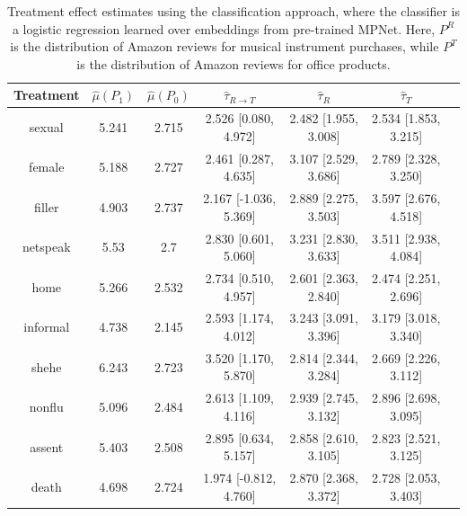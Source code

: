 \documentclass{article}
\begin{document}
\begin{table}[!ht]
    \centering
    \begin{tabular}{c|cccccc}
\toprule
      Treatment &   $\hat{\mu}(P_1)$ &   $\hat{\mu}(P_0)$ & $\hat{\tau}_{R \rightarrow T}$   & $\hat{\tau}_R$       & $\hat{\tau}_T$       \\
\midrule
    sexual   &              5.241 &              2.715 & 2.526 [0.080, 4.972]             & 2.482 [1.955, 3.008] & 2.534 [1.853, 3.215] \\
    female   &              5.188 &              2.727 & 2.461 [0.287, 4.635]             & 3.107 [2.529, 3.686] & 2.789 [2.328, 3.250] \\
    filler   &              4.903 &              2.737 & 2.167 [-1.036, 5.369]            & 2.889 [2.275, 3.503] & 3.597 [2.676, 4.518] \\
    netspeak &              5.53  &              2.7   & 2.830 [0.601, 5.060]             & 3.231 [2.830, 3.633] & 3.511 [2.938, 4.084] \\
    home     &              5.266 &              2.532 & 2.734 [0.510, 4.957]             & 2.601 [2.363, 2.840] & 2.474 [2.251, 2.696] \\
    informal &              4.738 &              2.145 & 2.593 [1.174, 4.012]             & 3.243 [3.091, 3.396] & 3.179 [3.018, 3.340] \\
    shehe    &              6.243 &              2.723 & 3.520 [1.170, 5.870]             & 2.814 [2.344, 3.284] & 2.669 [2.226, 3.112] \\
    nonflu   &              5.096 &              2.484 & 2.613 [1.109, 4.116]             & 2.939 [2.745, 3.132] & 2.896 [2.698, 3.095] \\
    assent   &              5.403 &              2.508 & 2.895 [0.634, 5.157]             & 2.858 [2.610, 3.105] & 2.823 [2.521, 3.125] \\
    death    &              4.698 &              2.724 & 1.974 [-0.812, 4.760]            & 2.870 [2.368, 3.372] & 2.728 [2.053, 3.403] \\
 \bottomrule
    \end{tabular}
    \caption{Treatment effect estimates using the classification approach, where the classifier is a logistic regression learned over embeddings from pre-trained MPNet. Here, $P^R$ is the distribution of Amazon reviews for musical instrument purchases, while $P^T$ is the distribution of Amazon reviews for office products.}
    \label{tab:results_clf_mpnet_amazon_synthetic}
\end{table}
\end{document}
